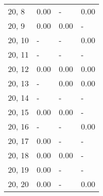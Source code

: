 \begin{table}
\begin{tabular}{llll}
20, 8  &  0.00 &     - &  0.00 \\
20, 9  &  0.00 &  0.00 &     - \\
20, 10 &     - &     - &  0.00 \\
20, 11 &     - &     - &     - \\
20, 12 &  0.00 &  0.00 &  0.00 \\
20, 13 &     - &  0.00 &  0.00 \\
20, 14 &     - &     - &     - \\
20, 15 &  0.00 &  0.00 &     - \\
20, 16 &     - &     - &  0.00 \\
20, 17 &  0.00 &     - &     - \\
20, 18 &  0.00 &  0.00 &     - \\
20, 19 &  0.00 &     - &     - \\
20, 20 &  0.00 &     - &  0.00 \\
\bottomrule
\end{tabular}
\end{table}
